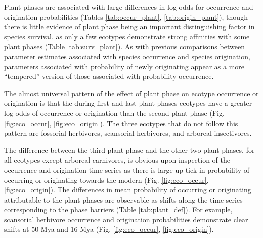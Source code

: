 \documentclass[12pt,letterpaper]{article}
\begin{document}
Plant phases are associated with large differences in log-odds for occurrence and origination probabilities (Tables \ref{tab:occur_plant}, \ref{tab:origin_plant}), though there is little evidence of plant phase being an important distinguishing factor in species survival, as only a few ecotypes demonstrate strong affinities with some plant phases (Table \ref{tab:surv_plant}). As with previous comparisons between parameter estimates associated with species occurrence and species origination, parameters associated with probability of newly originating appear as a more ``tempered'' version of those associated with probability occurrence. 

The almost universal pattern of the effect of plant phase on ecotype occurrence or origination is that the during first and last plant phases ecotypes have a greater log-odds of occurrence or origination than the second plant phase (Fig. \ref{fig:eco_occur}, \ref{fig:eco_origin}). The three ecotypes that do not follow this pattern are fossorial herbivores, scansorial herbivores, and arboreal insectivores.

The difference between the third plant phase and the other two plant phases, for all ecotypes except arboreal carnivores, is obvious upon inspection of the occurrence and origination time series as there is large up-tick in probability of occurring or originating towards the modern (Fig. \ref{fig:eco_occur}, \ref{fig:eco_origin}). The differences in mean probability of occurring or originating attributable to the plant phases are observable as shifts along the time series corresponding to the phase barriers (Table \ref{tab:plant_def}). For example, scansorial herbivore occurrence and origination probabilities demonstrate clear shifts at 50 Mya and 16 Mya (Fig. \ref{fig:eco_occur}, \ref{fig:eco_origin}).
\end{document}
